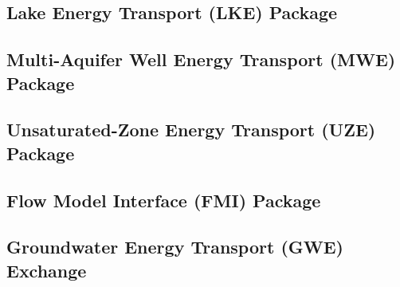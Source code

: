 \newpage
\subsection{Lake Energy Transport (LKE) Package}


\newpage
\subsection{Multi-Aquifer Well Energy Transport (MWE) Package}


\newpage
\subsection{Unsaturated-Zone Energy Transport (UZE) Package}


\newpage
\subsection{Flow Model Interface (FMI) Package}


\newpage
\subsection{Groundwater Energy Transport (GWE) Exchange}


